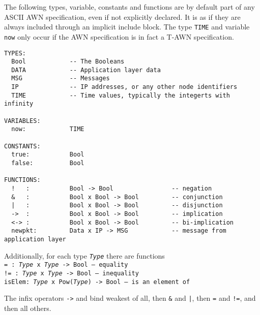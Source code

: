 \documentclass[adraft]{eptcs}
\newcommand{\aac}[1]{{\tt #1}}    %
\begin{document}
The following types, variable, constants and functions are by default part of any ASCII AWN
specification, even if not explicitly declared. It is as if they are always included through an
implicit include block. The type {\tt TIME} and variable {\tt now} only occur if the AWN
specification is in fact a T-AWN specification.
\vspace{1ex}
\begin{verbatim}
TYPES:
  Bool            -- The Booleans
  DATA            -- Application layer data
  MSG             -- Messages
  IP              -- IP addresses, or any other node identifiers
  TIME            -- Time values, typically the integerts with infinity

VARIABLES:
  now:            TIME

CONSTANTS:
  true:           Bool
  false:          Bool

FUNCTIONS:
  !   :           Bool -> Bool                -- negation
  &   :           Bool x Bool -> Bool         -- conjunction
  |   :           Bool x Bool -> Bool         -- disjunction
  ->  :           Bool x Bool -> Bool         -- implication
  <-> :           Bool x Bool -> Bool         -- bi-implication
  newpkt:         Data x IP -> MSG            -- message from application layer
\end{verbatim}
\vspace{9pt}
Additionally, for each type {\tt \textit{Type}} there are functions\\
\mbox{}\hspace{12pt} {\tt  = \hspace{4pt}  :  \hspace{38pt} \textit{Type} x \textit{Type} -> Bool \hspace{38pt} -- equality}\\
\mbox{}\hspace{11pt} {\tt != \hspace{0pt}  :  \hspace{38pt} \textit{Type} x \textit{Type} -> Bool \hspace{38pt} -- inequality}\\
\mbox{}\hspace{11pt} {\tt  isElem:  \hspace{26pt} \textit{Type} x \aac{Pow}(\textit{Type}) -> Bool \hspace{10pt} -- is an element of}

\noindent
The infix operators {\tt ->} and {\tt <->} bind weakest of all, then {\tt \&} and {\tt |}, then
{\tt =} and {\tt !=}, and then all others.
\end{document}
